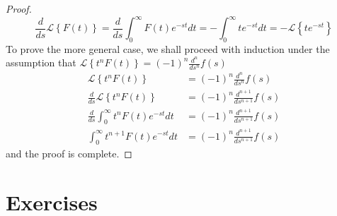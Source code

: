 \documentclass{report}
\theoremstyle{definition}
\theoremstyle{remark}
\newcommand{\lapt}[1]{\mathscr{L}\left\{ #1\right\}}
\newcommand{\od}[2]{\frac{d #1}{d#2}}
\begin{document}
\begin{proof}
    \begin{equation*}
        \od{}{s}\lapt{F(t)} = \od{}{s} \int^\infty_0F(t)e^{-st}dt = -\int^\infty_0 te^{-st}dt = -\lapt{te^{-st}} 
    \end{equation*}
    To prove the more general case, we shall proceed with induction under the assumption that $\lapt{t^nF(t)} = (-1)^n \od{^n}{s^n}f(s)$
    \begin{equation*}
        \begin{split}
            \lapt{t^nF(t)} &= (-1)^n \od{^n}{s^n}f(s) \\
            \od{}{s}\lapt{t^nF(t)} &= (-1)^n \od{^{n+1}}{s^{n+1}}f(s)\\
            \od{}{s} \int^\infty_0 t^nF(t)e^{-st}dt &= (-1)^n \od{^{n+1}}{s^{n+1}}f(s) \\
            \int^\infty_0t^{n+1}F(t)e^{-st}dt &=(-1)^n \od{^{n+1}}{s^{n+1}} f(s) 
        \end{split}
    \end{equation*}
    and the proof is complete.
\end{proof}
\section{Exercises}
\end{document}
